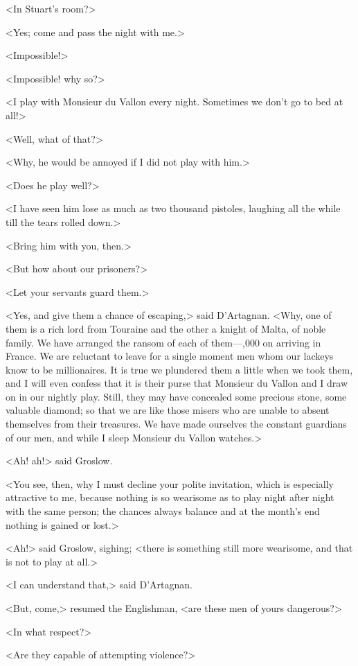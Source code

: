 <In Stuart's room?>

<Yes; come and pass the night with me.>

<Impossible!>

<Impossible! why so?>

<I play with Monsieur du Vallon every night. Sometimes we don't go to bed at all!>

<Well, what of that?>

<Why, he would be annoyed if I did not play with him.>

<Does he play well?>

<I have seen him lose as much as two thousand pistoles, laughing all the while till the tears rolled down.>

<Bring him with you, then.>

<But how about our prisoners?>

<Let your servants guard them.>

<Yes, and give them a chance of escaping,> said D'Artagnan. <Why, one of them is a rich lord from Touraine and the other a knight of Malta, of noble family. We have arranged the ransom of each of them—,000 on arriving in France. We are reluctant to leave for a single moment men whom our lackeys know to be millionaires. It is true we plundered them a little when we took them, and I will even confess that it is their purse that Monsieur du Vallon and I draw on in our nightly play. Still, they may have concealed some precious stone, some valuable diamond; so that we are like those misers who are unable to absent themselves from their treasures. We have made ourselves the constant guardians of our men, and while I sleep Monsieur du Vallon watches.>

<Ah! ah!> said Groslow.

<You see, then, why I must decline your polite invitation, which is especially attractive to me, because nothing is so wearisome as to play night after night with the same person; the chances always balance and at the month's end nothing is gained or lost.>

<Ah!> said Groslow, sighing; <there is something still more wearisome, and that is not to play at all.>

<I can understand that,> said D'Artagnan.

<But, come,> resumed the Englishman, <are these men of yours dangerous?>

<In what respect?>

<Are they capable of attempting violence?>

